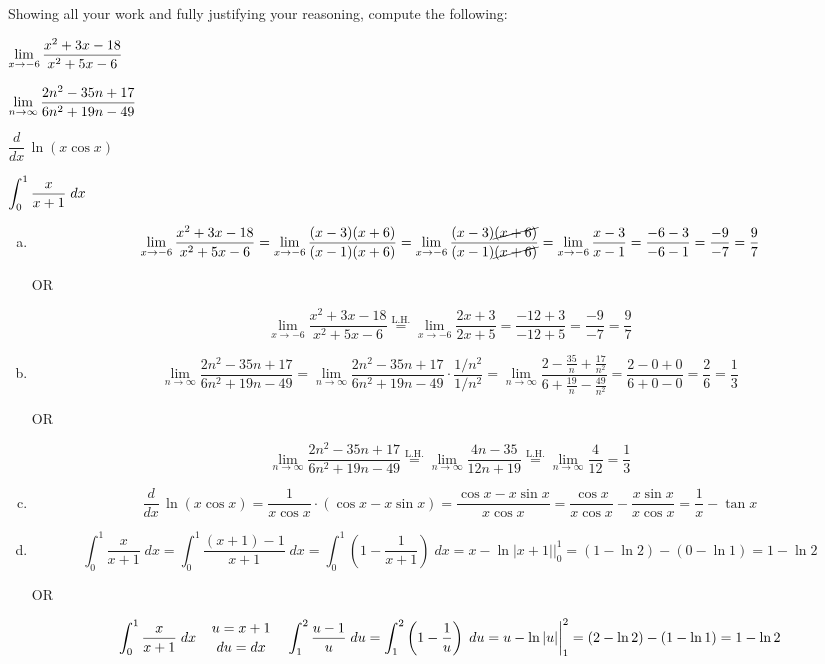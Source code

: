 \documentclass[11pt,letterpaper]{article}
\newcommand{\lh}{\stackrel{\text{L.H.}}{=}} %
\begin{document}

 Showing all your work and fully justifying your reasoning, compute the following:
	\begin{2enumerate}
	\item $\displaystyle \lim_{x \to -6} \dfrac{x^2 + 3x - 18}{x^2 + 5x - 6}$
	\item $\displaystyle \lim_{n \to \infty} \dfrac{2n^2 - 35n + 17}{6n^2 + 19n - 49}$
	\item $\dfrac{d}{dx} \, \ln \left(x \cos x \right)$
	\item $\displaystyle \int_0^1 \dfrac{x}{x + 1} \;dx$
	\end{2enumerate} \pspace

\sol 
\begin{enumerate}[(a)]
\item 
	\[
	\lim_{x \to -6} \dfrac{x^2 + 3x - 18}{x^2 + 5x - 6}= \lim_{x \to -6} \dfrac{(x - 3)(x + 6)}{(x - 1)(x + 6)}= \lim_{x \to -6} \dfrac{(x - 3) \cancel{(x + 6)}}{(x - 1) \cancel{(x + 6)}}= \lim_{x \to -6} \dfrac{x - 3}{x - 1}= \dfrac{-6 - 3}{-6 - 1}= \dfrac{-9}{-7}= \dfrac{9}{7}
	\] 
		\begin{center} OR \end{center}
	\[
	\lim_{x \to -6} \dfrac{x^2 + 3x - 18}{x^2 + 5x - 6} \lh \lim_{x \to -6} \dfrac{2x + 3}{2x + 5}= \dfrac{-12 + 3}{-12 + 5}= \dfrac{-9}{-7}= \dfrac{9}{7}
	\] \pspace

\item 
	\[
	\lim_{n \to \infty} \dfrac{2n^2 - 35n + 17}{6n^2 + 19n - 49}= \lim_{n \to \infty} \dfrac{2n^2 - 35n + 17}{6n^2 + 19n - 49} \cdot \dfrac{1/n^2}{1/n^2}= \lim_{n \to \infty} \dfrac{2 - \frac{35}{n} + \frac{17}{n^2}}{6 + \frac{19}{n} - \frac{49}{n^2}}= \dfrac{2 - 0 + 0}{6 + 0 - 0}= \dfrac{2}{6}= \dfrac{1}{3}
	\]
		\begin{center} OR \end{center}
	\[
	\lim_{n \to \infty} \dfrac{2n^2 - 35n + 17}{6n^2 + 19n - 49} \lh \lim_{n \to \infty} \dfrac{4n - 35}{12n + 19} \lh \lim_{n \to \infty} \dfrac{4}{12}= \dfrac{1}{3}
	\] \pspace

\item 
	\[
	\dfrac{d}{dx} \, \ln \left(x \cos x \right)= \dfrac{1}{x \cos x} \cdot (\cos x - x \sin x)= \dfrac{\cos x - x \sin x}{x \cos x}= \dfrac{\cos x}{x \cos x} - \dfrac{x \sin x}{x \cos x}= \dfrac{1}{x} - \tan x
	\] \pspace

\item 
	\[
	\int_0^1 \dfrac{x}{x + 1} \;dx= \int_0^1 \dfrac{(x + 1) - 1}{x + 1} \;dx= \int_0^1 \left( 1 - \dfrac{1}{x + 1} \right) \;dx= x - \ln|x + 1| \bigg|_0^1= (1 - \ln 2) - (0 - \ln 1)= 1 - \ln 2
	\]
		\begin{center} OR \end{center}
	\[
	\int_0^1 \dfrac{x}{x + 1} \;dx \quad {u= x + 1 \atop du= dx} \quad \int_1^2 \dfrac{u - 1}{u} \;du= \int_1^2 \left(1 - \frac{1}{u} \right) \;du= u - \ln|u| \bigg|_1^2= (2 - \ln 2) - (1 - \ln 1)= 1 - \ln 2
	\]
\end{enumerate}
\end{document}

